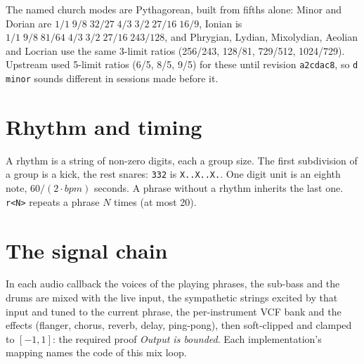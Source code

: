 \documentclass[11pt,oneside]{book}
\newcommand{\cmd}[1]{\texttt{#1}}
\begin{document}
The named church modes are Pythagorean, built from fifths alone: Minor and
Dorian are $1/1\;9/8\;32/27\;4/3\;3/2\;27/16\;16/9$, Ionian is
$1/1\;9/8\;81/64\;4/3\;3/2\;27/16\;243/128$, and Phrygian, Lydian, Mixolydian,
Aeolian and Locrian use the same 3-limit ratios (256/243, 128/81, 729/512,
1024/729). Upstream used 5-limit ratios (6/5, 8/5, 9/5) for these until
revision \texttt{a2cdac8}, so \cmd{d minor} sounds different in sessions made
before it.

\section{Rhythm and timing}
A rhythm is a string of non-zero digits, each a group size. The first
subdivision of a group is a kick, the rest snares: \cmd{332} is
\texttt{X..X..X.}. One digit unit is an eighth note, $60/(2\cdot\mathit{bpm})$
seconds. A phrase without a rhythm inherits the last one. \cmd{r<N>} repeats a
phrase $N$ times (at most 20).

\section{The signal chain}
In each audio callback the voices of the playing phrases, the sub-bass and the
drums are mixed with the live input, the sympathetic strings excited by that
input and tuned to the current phrase, the per-instrument VCF bank and the
effects (flanger, chorus, reverb, delay, ping-pong), then soft-clipped and
clamped to $[-1,1]$: the required proof \emph{Output is bounded}. Each
implementation's mapping names the code of this mix loop.
\end{document}
